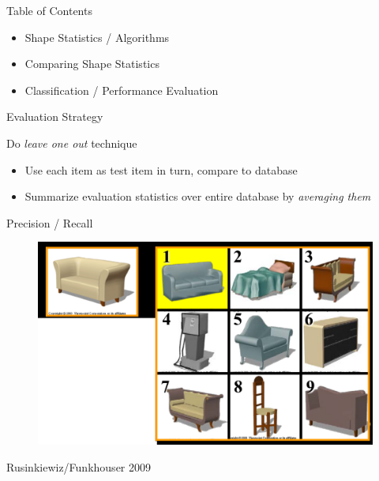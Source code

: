 \documentclass{beamer}
\begin{document}
\begin{frame}{Table of Contents}
\begin{itemize}[label=$\vartriangleright$]
	\item Shape Statistics / Algorithms
\end{itemize}
\begin{itemize}[label=$\vartriangleright$]
	\item Comparing Shape Statistics
\end{itemize}
\begin{itemize}[label=$\blacktriangleright$]
	\item Classification / Performance Evaluation
\end{itemize}
\end{frame}

\begin{frame}{Evaluation Strategy}

Do {\em leave one out} technique

\begin{itemize}

\item Use each item as test item in turn, compare to database

\end{itemize}

\begin{itemize}[label=$\blacktriangleright$]

\item Summarize evaluation statistics over entire database by {\em averaging them}

\end{itemize}

\end{frame}

\begin{frame}{Precision / Recall}

\begin{figure}[t]
	\centering
    \includegraphics[width=\textwidth]{PrecisionRecall.png}
\end{figure}

Rusinkiewiz/Funkhouser 2009

\end{frame}
\end{document}
